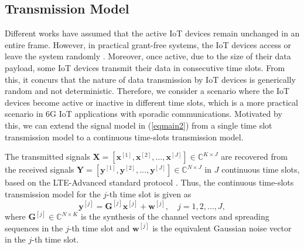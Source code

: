 \documentclass[journal,10pt]{IEEEtran}
\begin{document}
\subsection{Transmission Model}
Different works \cite{7462187, kim2020deep, zou2021joint} have assumed that the active IoT devices remain unchanged in an entire frame. However, in practical grant-free systems, the IoT devices access or leave the system randomly \cite{shahab2020grant}. Moreover, once active, due to the size of their data payload, some IoT devices transmit their data in consecutive time slots. From this, it concurs that the nature of data transmission by IoT devices is generically random and not deterministic. Therefore, we consider a scenario where the IoT devices become active or inactive in different time slots, which is a more practical scenario in 6G IoT applications with sporadic communications. Motivated by this, we can extend the signal model in (\ref{eqmain2}) from a single time slot transmission model to a continuous time-slots transmission model. 
 
 
The transmitted signals $\mathbf{X} = \left[ \mathbf{x}^{[1]}, \mathbf{x}^{[2]}, \hdots, \mathbf{x}^{[J]}   \right] \in \mathbb{C}^{K \times J} $ are recovered from the received signals $\mathbf{Y} = \left[ \mathbf{y}^{[1]}, \mathbf{y}^{[2]}, \hdots, \mathbf{y}^{[J]}   \right] \in \mathbb{C}^{N \times J}$ in $J$ continuous time slots, based on the LTE-Advanced standard protocol \cite{ETUR2021evolved}. Thus, the continuous time-slots transmission model for the $j$-th time slot is given as
\begin{equation} \label{ContiSys}
    \mathbf{y}^{[j]}  =	\mathbf{G}^{[j]} \mathbf{x}^{[j]} + \mathbf{w}^{[j]}, \quad j = 1,2, \hdots, J,
\end{equation}
where $\mathbf{G}^{[j]} \in \mathbb{C}^{N \times K}$ is the synthesis of the channel vectors and spreading sequences in the $j$-th time slot and $\mathbf{w}^{[j]}$ is the equivalent Gaussian noise vector in the $j$-th time slot.  
\end{document}
